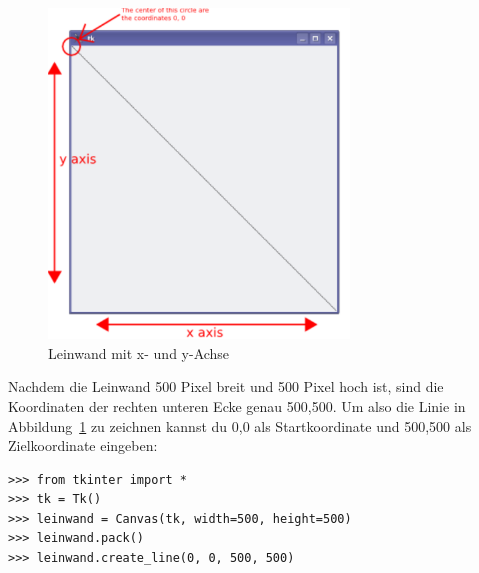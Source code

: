 \begin{figure}
\begin{center}
\includegraphics[width=80mm]{images/figure32}
\end{center}
\caption{Leinwand mit x- und y-Achse}\label{fig32}
\end{figure}

Nachdem die Leinwand 500 Pixel breit und 500 Pixel hoch ist, sind die Koordinaten der rechten unteren Ecke genau 500,500. Um also die Linie in Abbildung~\ref{fig32} zu zeichnen kannst du 0,0 als Startkoordinate und 500,500 als Zielkoordinate eingeben:

\begin{Verbatim}[frame=single]
>>> from tkinter import *
>>> tk = Tk()
>>> leinwand = Canvas(tk, width=500, height=500)
>>> leinwand.pack()
>>> leinwand.create_line(0, 0, 500, 500)
\end{Verbatim}

